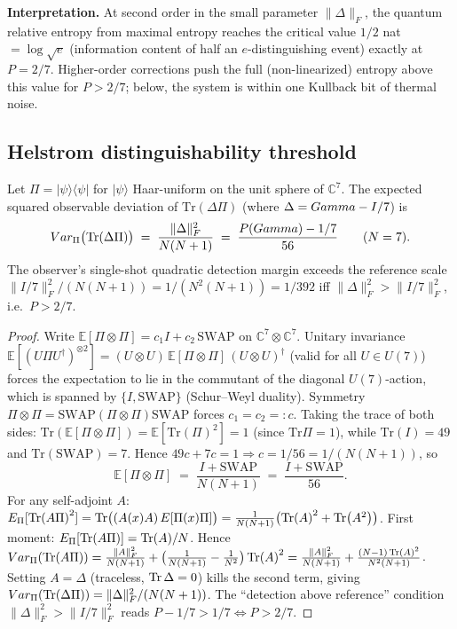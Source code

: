 \textbf{Interpretation.} At second order in the small parameter $\|\Delta\|_F$,
the quantum relative entropy from maximal entropy reaches the critical value
$1/2$ nat $= \log\sqrt{e}$ (information content of half an $e$-distinguishing event) exactly at
$P = 2/7$. Higher-order corrections push the full (non-linearized) entropy
above this value for $P > 2/7$; below, the system is within one Kullback bit
of thermal noise.

\subsection{Helstrom distinguishability threshold}
\label{app:pcrit-helstrom}

\begin{theorembox}
Let $\Pi = |\psi\rangle\langle\psi|$ for $|\psi\rangle$ Haar-uniform on the unit sphere of $\mathbb{C}^7$. The
expected squared observable deviation of $\mathrm{Tr}(\Delta\Pi)$ (where $\Delta = Gamma - I/7$) is
\[
  Var_{\Pi}\bigl(\Tr(\Delta\Pi)\bigr)
  \;=\;
  \frac{\|\Delta\|_F^2}{N(N+1)}
  \;=\;
  \frac{P(Gamma) - 1/7}{56}
  \qquad (N = 7).
\]
The observer's single-shot quadratic detection margin exceeds the reference
scale $\|I/7\|_F^2/(N(N+1)) = 1/(N^2(N+1)) = 1/392$ iff
$\|\Delta\|_F^2 > \|I/7\|_F^2$, i.e.\ $P > 2/7$.
\end{theorembox}

\begin{proof}
Write $\mathbb{E}[\Pi \otimes \Pi] = c_1 I + c_2\,\mathrm{SWAP}$ on $\mathbb{C}^7 \otimes \mathbb{C}^7$.
Unitary invariance $\mathbb{E}[(U\Pi U^{\dagger})^{\otimes 2}] = (U\otimes U)\,\mathbb{E}[\Pi\otimes\Pi]\,(U\otimes U)^{\dagger}$
(valid for all $U\in U(7)$) forces the expectation to lie in the commutant of the diagonal $U(7)$-action,
which is spanned by $\{I,\mathrm{SWAP}\}$ (Schur--Weyl duality). Symmetry $\Pi\otimes\Pi = \mathrm{SWAP}(\Pi\otimes\Pi)\mathrm{SWAP}$ forces $c_1 = c_2 =: c$.
Taking the trace of both sides:
$\mathrm{Tr}(\mathbb{E}[\Pi\otimes\Pi]) = \mathbb{E}[\mathrm{Tr}(\Pi)^{2}] = 1$ (since $\mathrm{Tr}\Pi = 1$),
while $\mathrm{Tr}(I) = 49$ and $\mathrm{Tr}(\mathrm{SWAP}) = 7$. Hence
$49c + 7c = 1 \Rightarrow c = 1/56 = 1/(N(N+1))$, so
\[
  \mathbb{E}[\Pi \otimes \Pi] \;=\; \frac{I + \mathrm{SWAP}}{N(N+1)} \;=\; \frac{I + \mathrm{SWAP}}{56}.
\]
For any self-adjoint $A$:
$E_\Pi[\Tr(A\Pi)^2] = \Tr\bigl((A(x) A)\,E[\Pi(x)\Pi]\bigr)
= \tfrac{1}{N(N+1)}\bigl(\Tr(A)^2 + \Tr(A^2)\bigr)$.
First moment: $E_\Pi[\Tr(A\Pi)] = \Tr(A)/N$. Hence
$Var_\Pi(\Tr(A\Pi)) = \tfrac{\|A\|_F^2}{N(N+1)} + \bigl(\tfrac{1}{N(N+1)} - \tfrac{1}{N^2}\bigr)\Tr(A)^2
= \tfrac{\|A\|_F^2}{N(N+1)} + \tfrac{(N-1)\Tr(A)^2}{N^2(N+1)}$.
Setting $A = \Delta$ (traceless, $\Tr\Delta = 0$) kills the second term, giving
$Var_\Pi(\Tr(\Delta\Pi)) = \|\Delta\|_F^2/(N(N+1))$.
The ``detection above reference'' condition $\|\Delta\|_F^2 > \|I/7\|_F^2$
reads $P - 1/7 > 1/7 \Leftrightarrow P > 2/7$.
\end{proof}

